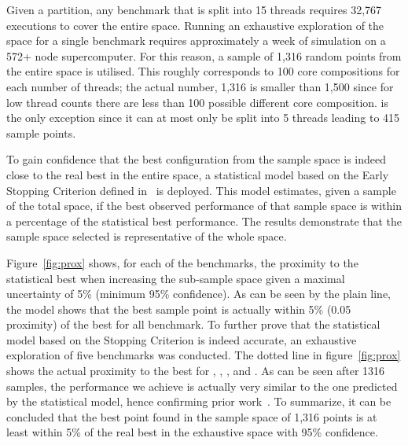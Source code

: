 Given a partition, any benchmark that is split into 15 threads requires 32,767 executions to cover the entire space.
Running an exhaustive exploration of the space for a single benchmark requires approximately a week of simulation on a 572+ node supercomputer.
For this reason, a sample of 1,316 random points from the entire space is utilised.
This roughly corresponds to 100 core compositions for each number of threads; the actual number, 1,316 is smaller than 1,500 since for low thread counts there are less than 100 possible different core composition.
 is the only exception since it can at most only be split into 5 threads leading to 415 sample points.

To gain confidence that the best configuration from the sample space is indeed close to the real best in the entire space, a statistical model based on the Early Stopping Criterion defined in~\cite{vuduc2003AutomaticPerf} is deployed. 
This model estimates, given a sample of the total space, if the best observed performance of that sample space is within a percentage of the statistical best performance.
The results demonstrate that the sample space selected is representative of the whole space.

Figure~\ref{fig:prox} shows, for each of the benchmarks, the proximity to the statistical best when increasing the sub-sample space given a maximal uncertainty of 5\%  (\ie minimum 95\% confidence).
As can be seen by the plain line, the model shows that the best sample point is actually within 5\% (0.05 proximity) of the best for all benchmark.
To further prove that the statistical model based on the Stopping Criterion is indeed accurate, an exhaustive exploration of five benchmarks was conducted.
The dotted line in figure~\ref{fig:prox} shows the actual proximity to the best for , , ,  and .
As can be seen after 1316 samples, the performance we achieve is actually very similar to the one predicted by the statistical model, hence confirming prior work~\cite{vuduc2003AutomaticPerf}.
To summarize, it can be concluded that the best point found in the sample space of 1,316 points is at least within 5\% of the real best in the exhaustive space with 95\% confidence.